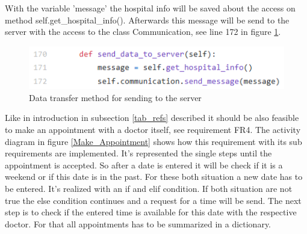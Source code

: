 With the variable 'message' the hospital info will be saved about the access on method self.get_hospital_info(). Afterwards this message will be send to the server with the access to the class Communication, see line 172 in figure \ref{send_hosp_info}. 


\begin{figure}
\centering
\sidecaption
\includegraphics[scale=.7]{images/melanie_images/send_hospital_info.png}
\caption{Data transfer method for sending to the server}
\label{send_hosp_info}
\end{figure}

Like in introduction in subsection \ref{tab_refs} described it should be also feasible to make an appointment with a doctor itself, see requirement FR4. The activity diagram in figure \ref{Make_Appointment} shows how this requirement with its sub requirements are implemented. It's represented the single steps until the appointment is accepted. So after a date is entered it will be check if it is a weekend or if this date is in the past. For these both situation a new date has to be entered. It's realized with an if and elif condition. If both situation are not true the else condition continues and a request for a time will be send. The next step is to check if the entered time is available for this date with the respective doctor. For that all appointments has to be summarized in a dictionary.

